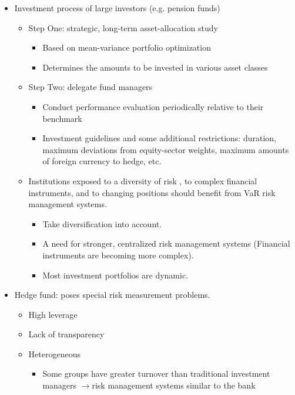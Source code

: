 \begin{itemize}
\item Investment process of large investors (e.g. pension funds)
    \begin{itemize}
    \item Step One: strategic, long-term asset-allocation study
        \begin{itemize}
        \item Based on mean-variance portfolio optimization
        \item Determines the amounts to be invested in various asset classes
        \end{itemize}
    \item Step Two: delegate fund managers
        \begin{itemize}
        \item Conduct performance evaluation periodically relative to their benchmark
        \item Investment guidelines and some additional restrictions: duration, maximum deviations from equity-sector weights, maximum amounts of foreign currency to hedge, etc.
        \end{itemize}
    \item Institutions exposed to a diversity of risk , to complex financial instruments, and to changing positions should benefit from VaR risk management systems.
        \begin{itemize}
        \item Take diversification into account.
        \item A need for stronger, centralized risk management systems (Financial instruments are becoming more complex).
        \item Most investment portfolios are dynamic.
        \end{itemize}
    \end{itemize}
\item Hedge fund: poses special risk measurement problems.
    \begin{itemize}
    \item High leverage
    \item Lack of transparency
    \item Heterogeneous
        \begin{itemize}
        \item Some groups have greater turnover than traditional investment managers $\to$risk management systems similar to the bank
        \end{itemize}
    \end{itemize}
\end{itemize}






